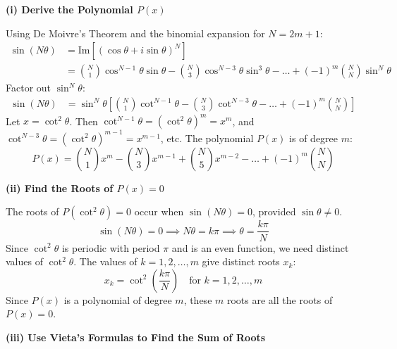 





\begin{solution}

\textbf{(i) Derive the Polynomial $P(x)$}

Using De Moivre's Theorem and the binomial expansion for $N=2m+1$:
\begin{align*} 
\sin(N\theta) &= \text{Im}[(\cos\theta+i\sin\theta)^N] \\
&= \binom{N}{1}\cos^{N-1}\theta\sin\theta - \binom{N}{3}\cos^{N-3}\theta\sin^3\theta - \dots + (-1)^m \binom{N}{N}\sin^N\theta
\end{align*}
Factor out $\sin^N\theta$:
\begin{align*}
\sin(N\theta) 
&= \sin^N\theta \left[ \binom{N}{1}\cot^{N-1}\theta - \binom{N}{3}\cot^{N-3}\theta - \dots + (-1)^m \binom{N}{N} \right]
\end{align*}
Let $x = \cot^2\theta$. Then $\cot^{N-1}\theta = (\cot^2\theta)^m = x^m$, and $\cot^{N-3}\theta = (\cot^2\theta)^{m-1} = x^{m-1}$, etc.
The polynomial $P(x)$ is of degree $m$:
\[ P(x) = \binom{N}{1}x^m - \binom{N}{3}x^{m-1} + \binom{N}{5}x^{m-2} - \dots + (-1)^m \binom{N}{N} \]

\textbf{(ii) Find the Roots of $P(x) = 0$}

The roots of $P(\cot^2\theta) = 0$ occur when $\sin(N\theta) = 0$, provided $\sin\theta \neq 0$.
$$ \sin(N\theta) = 0 \implies N\theta = k\pi \implies \theta = \frac{k\pi}{N} $$
Since $\cot^2\theta$ is periodic with period $\pi$ and is an even function, we need distinct values of $\cot^2\theta$. The values of $k = 1, 2, \dots, m$ give distinct roots $x_k$:
$$ x_k = \cot^2\left(\frac{k\pi}{N}\right) \quad \text{for } k=1, 2, \dots, m $$
Since $P(x)$ is a polynomial of degree $m$, these $m$ roots are all the roots of $P(x)=0$.

\textbf{(iii) Use Vieta's Formulas to Find the Sum of Roots}


\end{solution}
